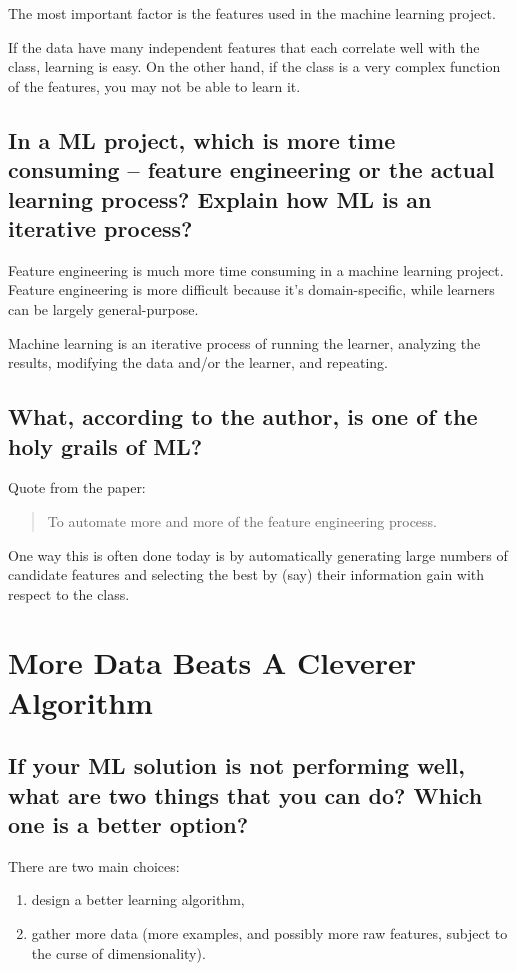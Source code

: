 \documentclass[12pt]{article}
\begin{document}
The most important factor is the features used in the machine learning project.

If the data have many independent features that each correlate well with the
class, learning is easy. On the other hand, if the class is a very complex
function of the features, you may not be able to learn it.

\subsection{In a ML project, which is more time consuming – feature engineering
or the actual learning process? Explain how ML is an iterative process?}

Feature engineering is much more time consuming in a machine learning project.
Feature engineering is more difficult because it’s domain-specific, while
learners can be largely general-purpose.

Machine learning is an iterative process of running the learner, analyzing the
results, modifying the data and/or the learner, and repeating.

\subsection{What, according to the author, is one of the holy grails of ML?}

Quote from the paper:

\begin{quote}
    To automate more and more of the feature engineering process.
\end{quote}

One way this is often done today is by automatically generating large numbers
of candidate features and selecting the best by (say) their information gain
with respect to the class.

\section{More Data Beats A Cleverer Algorithm}

\subsection{If your ML solution is not performing well, what are two things
that you can do? Which one is a better option?}

There are two main choices:

\begin{enumerate}
    \item design a better learning algorithm,
    \item gather more data (more examples, and possibly more raw features,
        subject to the curse of dimensionality).
\end{enumerate}
\end{document}
